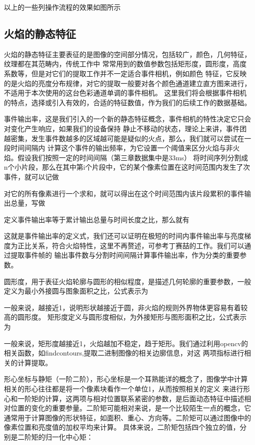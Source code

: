 以上的一些列操作流程的效果如图所示

\subsection{火焰的静态特征}
火焰的静态特征主要表征的是图像的空间部分情况，包括较广，颜色，几何特征，纹理都在其范畴内，传统工作中
常常用到的数值参数包括矩形度，圆形度，高度系数等，但是对它们的提取工作并不一定适合事件相机，例如颜色
特征，它反映的是火焰的亮度分布规律，对它的提取一般要对各个颜色通道建立直方图来进行，不适用于本次使用的这台色彩通道单调的事件相机。
这里我们将会根据事件相机的特点，选择或引入有效的，合适的特征数值，作为我们的后续工作的数据基础。

事件输出率，这是我们引入的一个新的静态特征概念，事件相机的特性决定它只会对变化产生响应，如果我们的设备保持
静止不移动的状态，理论上来讲，事件团越密集，发生事件数越多的区域越可能是疑似的火点，那么，我们就可以尝试在一段时间间隔内
计算这个事件的输出频率，为它设置一个阈值来区分火焰与非火焰。假设我们按照一定的时间间隔（第三章数据集中是33ms）
将时间序列分割成n个小片段，那么在其中第i个片段中，它的某个像素位置在这时间范围内发生了次事件，就可以记做

对它的所有像素进行一个求和，就可以得出在这个时间范围内该片段累积的事件输出总量，写做

定义事件输出率等于累计输出总量与时间长度之比，那么就有

这就是事件输出率的定义式，我们还可以证明在极短的时间内事件输出率与亮度梯度为正比关系，符合火焰特性，这里不再赘述，可参考丁赛喆的工作。我们可以通过提取事件帧的
输出事件数与分割时间间隔计算事件输出率，作为分类的重要参数。

圆形度，用于表征火焰轮廓与圆形的相似程度，是描述几何轮廓的重要参数，一般定义为最小外接圆与图象面积之比，公式表示为


一般来说，越接近1，说明形状越接近于圆，非火焰的规则外界物体更容易有着较高的圆形度。
矩形度定义与圆形度相似，为外接矩形与图形面积之比，公式表示为

一般来说，矩形度越接近1，火焰越加不稳定，趋于矩形。我们通过利用opencv的相关函数，如findcontours,提取二进制图像的相关边廓信息，对这
两项指标进行相关的计算提取。

形心坐标与静矩（一阶二阶），形心坐标是一个耳熟能详的概念了，图像学中计算相关的形心往往都是将一个像素块看作一个单位1，从而按照相关的定义
来进行形心和一阶矩的计算，这两项与相对位置联系紧密的参数，是后面动态特征中描述相对位置的变化的重要参量。二阶矩可能相对来说，是一个比较陌生一点的概念，它通常用于计算图像的形状特征，如面积、重心、方向等。二阶矩可以通过图像中的像素位置和亮度值的加权平均来计算。
具体来说，二阶矩包括四个独立的值，分别是二阶矩的归一化中心矩：

